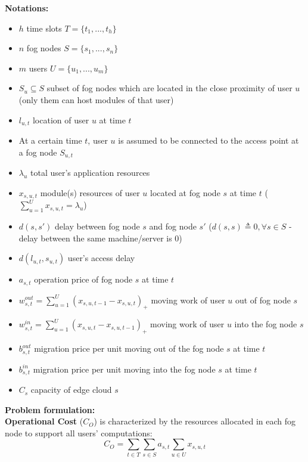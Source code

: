 \documentclass{article}
\begin{document}
\vspace{12pt}
\noindent\textbf{Notations:}\\[6pt]
\begin{itemize}
    \item $h$ time slots $T=\{t_1, ..., t_h\}$
    \item $n$ fog nodes $S=\{s_1, ..., s_n\}$
    \item $m$ users $U=\{u_1, ..., u_m\}$
    \item $S_u \subseteq S$ subset of fog nodes which are located in the close proximity of user $u$ (only them can host modules of that user)\\
    
    \item $l_{u,t}$ location of user $u$ at time $t$
    \item At a certain time $t$, user $u$ is assumed to be connected to the access point at a fog node $S_{u,t}$
    \item $\lambda_u$ total user's application resources
    \item $x_{s,u,t}$ module(s) resources of user $u$ located at fog node $s$ at time $t$ ($\sum_{u=1}^U x_{s,u,t} = \lambda_u$)
    \item $d(s, s')$ delay between fog node $s$ and fog node $s'$ ($d(s, s) \triangleq 0, \forall s \in S$ - delay between the same machine/server is 0)
    \item $d(l_{u,t}, s_{u,t})$ user's access delay
    \item $a_{s,t}$ operation price of fog node $s$ at time $t$
    \item $w^{out}_{s,t} = \sum_{u = 1}^U (x_{s,u,t-1} - x_{s,u,t})_+$ moving work of user $u$ out of fog node $s$
    \item $w^{in}_{s,t} = \sum_{u = 1}^U (x_{s,u,t} - x_{s,u,t-1})_+$ moving work of user $u$ into the fog node $s$\\
    
    \item $b^{out}_{s,t}$ migration price per unit moving out of the fog node $s$ at time $t$
    \item $b^{in}_{s,t}$ migration price per unit moving into the fog node $s$ at time $t$
    \item $C_s$ capacity of edge cloud $s$
\end{itemize}

\vspace{12pt}
\noindent\textbf{Problem formulation:}\\[6pt]
\noindent\textbf{Operational Cost} ($C_O$) is characterized by the resources allocated in each fog node to support all users' computations:
\begin{equation}
    C_O = \sum_{t \in T} \sum_{s \in S} a_{s,t} \sum_{u \in U} x_{s,u,t}
\end{equation}
\end{document}
